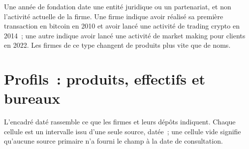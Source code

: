 \begin{remark}\label{rem:in:proprietary-market-makers-and-high-frequency-firms:founding}
Une année de fondation date une entité juridique ou un partenariat, et non l'activité actuelle de la firme. Une firme indique avoir réalisé
sa première transaction en bitcoin en 2010 et avoir lancé une activité de trading crypto en 2014~; une autre indique avoir lancé
une activité de market making pour clients en 2022. Les firmes de ce type changent de produits plus vite que de noms.
\end{remark}

\section{Profils~: produits, effectifs et bureaux}

L'encadré daté rassemble ce que les firmes et leurs dépôts indiquent. Chaque cellule est un intervalle issu d'une seule source, datée~; une
cellule vide signifie qu'aucune source primaire n'a fourni le champ à la date de consultation.

